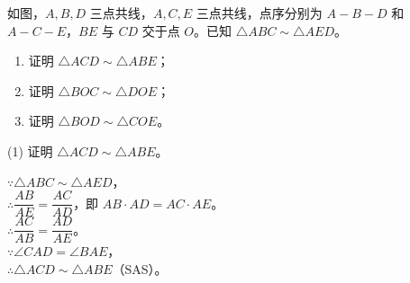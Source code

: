 \documentclass{exam-zh}
\begin{document}

\begin{eduProblemBlock}[模型例题]
\noindent
\begin{minipage}[t]{\dimexpr\linewidth-70mm-6mm\relax}
\vspace{0pt}
如图，$A,B,D$ 三点共线，$A,C,E$ 三点共线，点序分别为 $A-B-D$ 和 $A-C-E$，$BE$ 与 $CD$ 交于点 $O$。已知 $\triangle ABC\sim\triangle AED$。


\begin{enumerate}[label=(\arabic*)]
  \item 证明 $\triangle ACD\sim\triangle ABE$；
  \item 证明 $\triangle BOC\sim\triangle DOE$；
  \item 证明 $\triangle BOD\sim\triangle COE$。
\end{enumerate}

\end{minipage}\hfill
\begin{diagramcoltikz}{70mm}{先找 $A$ 处的共角，再找 $O$ 处的对顶角。}
}
\end{diagramcoltikz}
\end{eduProblemBlock}









\begin{eduSubQuestionItem}{(1)}
证明 $\triangle ACD\sim\triangle ABE$。\end{eduSubQuestionItem}

\begin{eduDualExplain}
  \begin{eduExplainLeft}
  \end{eduExplainLeft}

  \begin{eduExplainRight}
      {$\because \triangle ABC\sim\triangle AED$，\\
$\therefore \dfrac{AB}{AE}=\dfrac{AC}{AD}$，即 $AB\cdot AD=AC\cdot AE$。\\
$\therefore \dfrac{AC}{AB}=\dfrac{AD}{AE}$。\\
$\because \angle CAD=\angle BAE$，\\
$\therefore \triangle ACD\sim\triangle ABE$（SAS）。
}
  \end{eduExplainRight}
\end{eduDualExplain}
\end{document}
